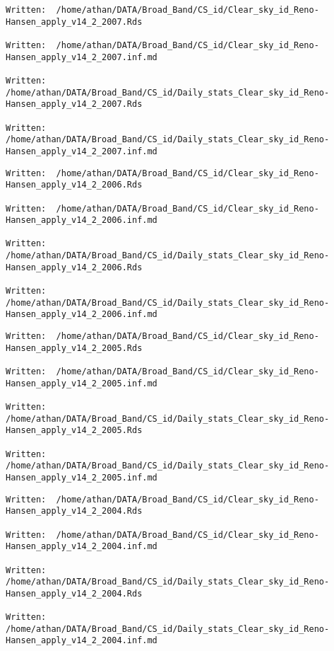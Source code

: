 \documentclass[
  10pt,
  a4paper,oneside]{article}
\begin{document}
\begin{verbatim}
Written:  /home/athan/DATA/Broad_Band/CS_id/Clear_sky_id_Reno-Hansen_apply_v14_2_2007.Rds 

Written:  /home/athan/DATA/Broad_Band/CS_id/Clear_sky_id_Reno-Hansen_apply_v14_2_2007.inf.md 

Written:  /home/athan/DATA/Broad_Band/CS_id/Daily_stats_Clear_sky_id_Reno-Hansen_apply_v14_2_2007.Rds 

Written:  /home/athan/DATA/Broad_Band/CS_id/Daily_stats_Clear_sky_id_Reno-Hansen_apply_v14_2_2007.inf.md 
\end{verbatim}

\begin{verbatim}
Written:  /home/athan/DATA/Broad_Band/CS_id/Clear_sky_id_Reno-Hansen_apply_v14_2_2006.Rds 

Written:  /home/athan/DATA/Broad_Band/CS_id/Clear_sky_id_Reno-Hansen_apply_v14_2_2006.inf.md 

Written:  /home/athan/DATA/Broad_Band/CS_id/Daily_stats_Clear_sky_id_Reno-Hansen_apply_v14_2_2006.Rds 

Written:  /home/athan/DATA/Broad_Band/CS_id/Daily_stats_Clear_sky_id_Reno-Hansen_apply_v14_2_2006.inf.md 
\end{verbatim}

\begin{verbatim}
Written:  /home/athan/DATA/Broad_Band/CS_id/Clear_sky_id_Reno-Hansen_apply_v14_2_2005.Rds 

Written:  /home/athan/DATA/Broad_Band/CS_id/Clear_sky_id_Reno-Hansen_apply_v14_2_2005.inf.md 

Written:  /home/athan/DATA/Broad_Band/CS_id/Daily_stats_Clear_sky_id_Reno-Hansen_apply_v14_2_2005.Rds 

Written:  /home/athan/DATA/Broad_Band/CS_id/Daily_stats_Clear_sky_id_Reno-Hansen_apply_v14_2_2005.inf.md 
\end{verbatim}

\begin{verbatim}
Written:  /home/athan/DATA/Broad_Band/CS_id/Clear_sky_id_Reno-Hansen_apply_v14_2_2004.Rds 

Written:  /home/athan/DATA/Broad_Band/CS_id/Clear_sky_id_Reno-Hansen_apply_v14_2_2004.inf.md 

Written:  /home/athan/DATA/Broad_Band/CS_id/Daily_stats_Clear_sky_id_Reno-Hansen_apply_v14_2_2004.Rds 

Written:  /home/athan/DATA/Broad_Band/CS_id/Daily_stats_Clear_sky_id_Reno-Hansen_apply_v14_2_2004.inf.md 
\end{verbatim}
\end{document}
